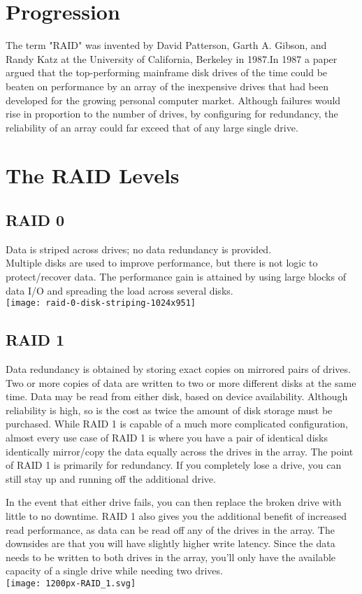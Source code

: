 \documentclass{article}
\begin{document}
\section{Progression}
The term "RAID" was invented by David Patterson, Garth A. Gibson, and Randy Katz at the University of California, Berkeley in 1987.In 1987 a paper  argued that the top-performing mainframe disk drives of the time could be beaten on performance by an array of the inexpensive drives that had been developed for the growing personal computer market. Although failures would rise in proportion to the number of drives, by configuring for redundancy, the reliability of an array could far exceed that of any large single drive.

\section{The RAID Levels }

\subsection{RAID 0}
Data is striped across drives; no data redundancy is provided.\\
Multiple disks are used to improve performance, but there is not logic to protect/recover data. The performance gain is attained by using large blocks of data I/O and spreading the load across several disks. \\
\texttt{[image: raid-0-disk-striping-1024x951]} 

\subsection{RAID 1}
Data redundancy is obtained by storing exact copies on mirrored pairs of drives.
Two or more copies of data are written to two or more different disks at the same time. Data may be read from either disk, based on device availability. Although reliability is high, so is the cost as twice the amount of disk storage must be purchased.
While RAID 1 is capable of a much more complicated configuration, almost every use case of RAID 1 is where you have a pair of identical disks identically mirror/copy the data equally across the drives in the array. The point of RAID 1 is primarily for redundancy. If you completely lose a drive, you can still stay up and running off the additional drive.

In the event that either drive fails, you can then replace the broken drive with little to no downtime. RAID 1 also gives you the additional benefit of increased read performance, as data can be read off any of the drives in the array. The downsides are that you will have slightly higher write latency. Since the data needs to be written to both drives in the array, you'll only have the available capacity of a single drive while needing two drives.\\
\texttt{[image: 1200px-RAID\_1.svg]} 
\end{document}
